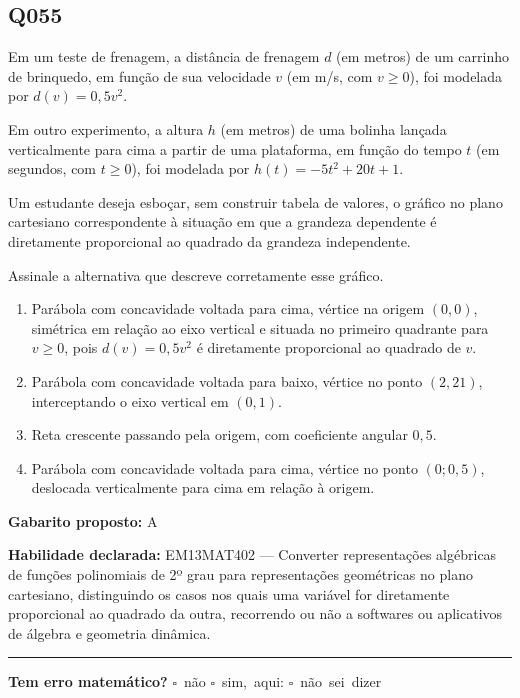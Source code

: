 \documentclass[11pt,a4paper]{article}
\begin{document}
\begin{samepage}
\subsection*{Q055}
Em um teste de frenagem, a distância de frenagem $d$ (em metros) de um carrinho de brinquedo, em função de sua velocidade $v$ (em m/s, com $v \geq 0$), foi modelada por $d(v) = 0{,}5v^2$.

Em outro experimento, a altura $h$ (em metros) de uma bolinha lançada verticalmente para cima a partir de uma plataforma, em função do tempo $t$ (em segundos, com $t \geq 0$), foi modelada por $h(t) = -5t^2 + 20t + 1$.

Um estudante deseja esboçar, sem construir tabela de valores, o gráfico no plano cartesiano correspondente à situação em que a grandeza dependente é diretamente proporcional ao quadrado da grandeza independente.

Assinale a alternativa que descreve corretamente esse gráfico.
\begin{enumerate}[label=(\alph*),nosep,leftmargin=*]
\item Parábola com concavidade voltada para cima, vértice na origem $(0,0)$, simétrica em relação ao eixo vertical e situada no primeiro quadrante para $v \geq 0$, pois $d(v)=0{,}5v^2$ é diretamente proporcional ao quadrado de $v$.
\item Parábola com concavidade voltada para baixo, vértice no ponto $(2,21)$, interceptando o eixo vertical em $(0,1)$.
\item Reta crescente passando pela origem, com coeficiente angular $0{,}5$.
\item Parábola com concavidade voltada para cima, vértice no ponto $(0; 0{,}5)$, deslocada verticalmente para cima em relação à origem.
\end{enumerate}

\textbf{Gabarito proposto:} A

\textbf{Habilidade declarada:} EM13MAT402 --- Converter representações algébricas de funções polinomiais de 2º grau para representações geométricas no plano cartesiano, distinguindo os casos nos quais uma variável for diretamente proporcional ao quadrado da outra, recorrendo ou não a softwares ou aplicativos de álgebra e geometria dinâmica.
\end{samepage}

\noindent\rule{\linewidth}{0.4pt}
\textbf{Tem erro matemático?}\quad
\mbox{$\square$~não} \quad \mbox{$\square$~sim, aqui:} \underline{\hspace{5cm}}
\quad \mbox{$\square$~não sei dizer}
\end{document}
